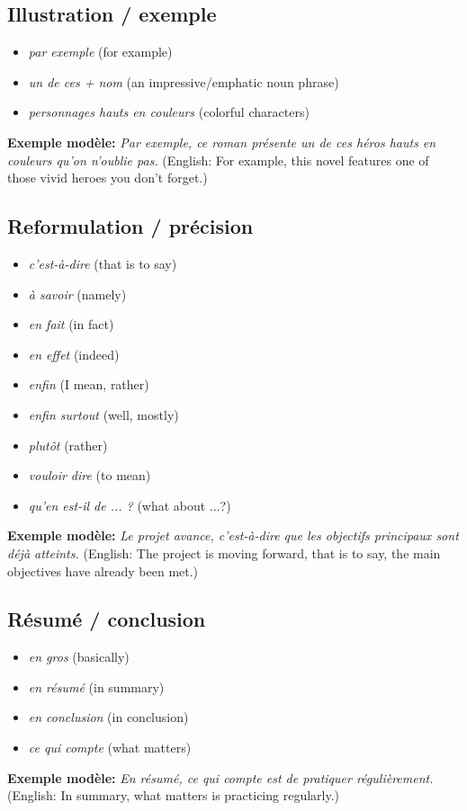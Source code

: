 \documentclass{article}
\begin{document}
\subsection{Illustration / exemple}
\begin{itemize}
    \item \textit{par exemple} (for example)
    \item \textit{un de ces + nom} (an impressive/emphatic noun phrase)
    \item \textit{personnages hauts en couleurs} (colorful characters)
\end{itemize}
\textbf{Exemple modèle:} \textit{Par exemple, ce roman présente un de ces héros hauts en couleurs qu'on n'oublie pas.} (English: For example, this novel features one of those vivid heroes you don't forget.)

\subsection{Reformulation / précision}
\begin{itemize}
    \item \textit{c'est-à-dire} (that is to say)
    \item \textit{à savoir} (namely)
    \item \textit{en fait} (in fact)
    \item \textit{en effet} (indeed)
    \item \textit{enfin} (I mean, rather)
    \item \textit{enfin surtout} (well, mostly)
    \item \textit{plutôt} (rather)
    \item \textit{vouloir dire} (to mean)
    \item \textit{qu'en est-il de ... ?} (what about ...?)
\end{itemize}
\textbf{Exemple modèle:} \textit{Le projet avance, c'est-à-dire que les objectifs principaux sont déjà atteints.} (English: The project is moving forward, that is to say, the main objectives have already been met.)

\subsection{Résumé / conclusion}
\begin{itemize}
    \item \textit{en gros} (basically)
    \item \textit{en résumé} (in summary)
    \item \textit{en conclusion} (in conclusion)
    \item \textit{ce qui compte} (what matters)
\end{itemize}
\textbf{Exemple modèle:} \textit{En résumé, ce qui compte est de pratiquer régulièrement.} (English: In summary, what matters is practicing regularly.)
\end{document}
